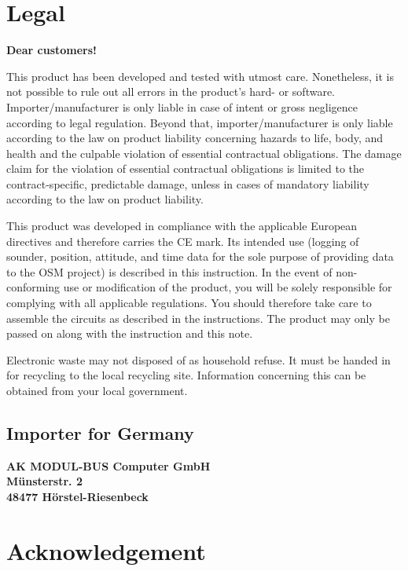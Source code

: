 \documentclass[pdftex, 8pt, paper=130mm:92mm,pagesize]{scrartcl}
\let\stdsection\section
\renewcommand\section{\newpage\stdsection}
\begin{document}
\section{Legal}
\textbf{\large{Dear customers!}}\normalsize

This product has been developed and tested with utmost care. Nonetheless, it is not possible to rule out all errors in the product's hard- or software. Importer/manufacturer is only liable in case of intent or gross negligence according to legal regulation. Beyond that, importer/manufacturer is only liable according to the law on product liability concerning hazards to life, body, and health and the culpable violation of essential contractual obligations. The damage claim for the violation of essential contractual obligations is limited to the contract-specific, predictable damage, unless in cases of mandatory liability according to the law on product liability.

This product was developed in compliance with the applicable European directives and therefore carries the CE mark. Its intended use (logging of sounder, position, attitude, and time data for the sole purpose of providing data to the OSM project) is described in this instruction. In the event of non-conforming use or modification of the product, you will be solely responsible for complying with all applicable regulations. You should therefore take care to assemble the circuits as described in the instructions. The product may only be passed on along with the instruction and this note.

Electronic waste may not disposed of as household refuse. It must be handed in for recycling to the local recycling site. Information concerning this can be obtained from your local government.



\subsection{Importer for Germany}
\textbf{AK MODUL-BUS Computer GmbH\\
Münsterstr. 2\\
48477 Hörstel-Riesenbeck }

\section{Acknowledgement}
\end{document}
